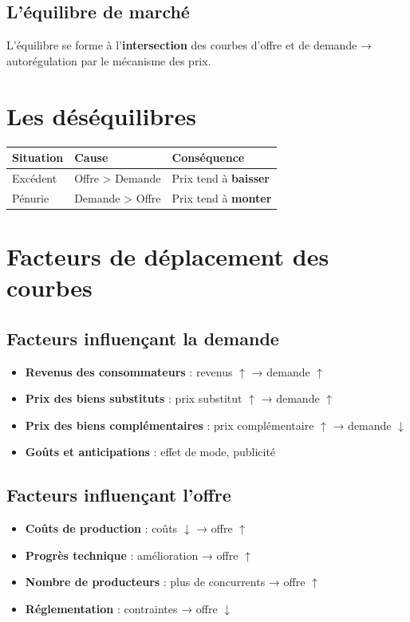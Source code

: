\documentclass[11pt,a4paper]{article}
\begin{document}
\subsection*{L'équilibre de marché}
\begin{keybox}
L'équilibre se forme à l'\textbf{intersection} des courbes d'offre et de demande → autorégulation par le mécanisme des prix.
\end{keybox}

\section*{Les déséquilibres}

\begin{center}
\begin{tabular}{|l|l|l|}
\hline
\textbf{Situation} & \textbf{Cause} & \textbf{Conséquence} \\
\hline
Excédent & Offre > Demande & Prix tend à \textbf{baisser} \\
Pénurie & Demande > Offre & Prix tend à \textbf{monter} \\
\hline
\end{tabular}
\end{center}

\section*{Facteurs de déplacement des courbes}

\subsection*{Facteurs influençant la demande}
\begin{itemize}
  \item \textbf{Revenus des consommateurs} : revenus $\uparrow$ → demande $\uparrow$
  \item \textbf{Prix des biens substituts} : prix substitut $\uparrow$ → demande $\uparrow$
  \item \textbf{Prix des biens complémentaires} : prix complémentaire $\uparrow$ → demande $\downarrow$
  \item \textbf{Goûts et anticipations} : effet de mode, publicité
\end{itemize}

\subsection*{Facteurs influençant l'offre}
\begin{itemize}
  \item \textbf{Coûts de production} : coûts $\downarrow$ → offre $\uparrow$
  \item \textbf{Progrès technique} : amélioration → offre $\uparrow$
  \item \textbf{Nombre de producteurs} : plus de concurrents → offre $\uparrow$
  \item \textbf{Réglementation} : contraintes → offre $\downarrow$
\end{itemize}
\end{document}
